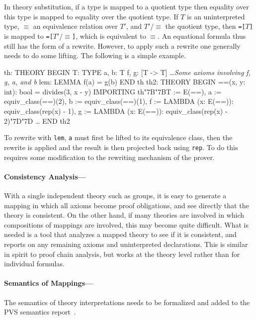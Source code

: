 \documentclass[11pt,twoside,openright,titlepage]{cslreport}
\def\mapb{\char"7B\char"7B}
\def\mape{\char"7D\char"7D}
\begin{document}
In theory substitution, if a type is mapped to a quotient type then
equality over this type is mapped to equality over the quotient type.
If $T$ is an uninterpreted type, $\equiv$ an equivalence relation over
$T'$, and $T'/\equiv$ the quotient type, then \texttt{=[$T$]} is mapped to
\texttt{=[$T'/\equiv$]}, which is equivalent to $\equiv$.  An equational
formula thus still has the form of a rewrite.  However, to apply such a
rewrite one generally needs to do some lifting.  The following is a simple
example.
\begin{session}
th: THEORY
 BEGIN
  T: TYPE
  a, b: T
  f, g: [T -> T]
  \ldots \emph{Some axioms involving f, g, a, and b}
  lem: LEMMA f(a) = g(b)
 END th
th2: THEORY
 BEGIN
  ==(x, y: int): bool = divides(3, x - y)
  IMPORTING th\mapb{}T := E(==),
                a := equiv_class(==)(2),
                b := equiv_class(==)(1),
                f := LAMBDA (x: E(==)): equiv_class(rep(x) - 1),
                g := LAMBDA (x: E(==)): equiv_class(rep(x) - 2)\mape{}
  \ldots
 END th2
\end{session}
\noindent To rewrite with \texttt{lem}, \texttt{a} must first be lifted to
its equivalence class, then the rewrite is applied and the result is then
projected back using \texttt{rep}.  To do this requires some modification
to the rewriting mechanism of the prover.

\paragraph{Consistency Analysis---}

With a single independent theory such as groups, it is easy to generate a
mapping in which all axioms become proof obligations, and see directly
that the theory is consistent.  On the other hand, if many theories are
involved in which compositions of mappings are involved, this may become
quite difficult.  What is needed is a tool that analyzes a mapped theory
to see if it is consistent, and reports on any remaining axioms and
uninterpreted declarations.  This is similar in spirit to proof chain
analysis, but works at the theory level rather than for individual
formulas.

\paragraph{Semantics of Mappings---}

The semantics of theory interpretations needs to be formalized and added
to the PVS semantics report~\cite{PVS-Semantics:TR}.
\end{document}
